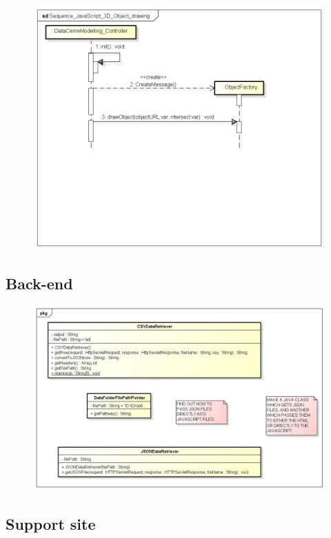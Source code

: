 \begin{figure}[H]
\centering
\includegraphics[width=5in]{Resources//Design_Diagrams//Sequence_JavaScript_3D_Object_drawing.png}
\caption{}
\label{}
\end{figure}

\subsection{Back-end}

\begin{figure}[H]
\centering
\includegraphics[width=5in]{Resources//Design_Diagrams//Class_Java Back-end.png}
\caption{}
\label{}
\end{figure}

\subsection{Support site}

